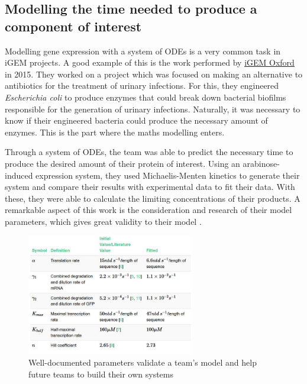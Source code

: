 \documentclass[11pt, letterpaper, english]{article}
\begin{document}
\subsection{Modelling the time needed to produce a component of interest}
\par {Modelling gene expression with a system of ODEs is a very common task in iGEM projects. A good example of this is the work performed by \href{https://2015.igem.org/Team:Oxford/Modelling#characterising-our-cells}{iGEM Oxford} in 2015. They worked on a project which was focused on making an alternative to antibiotics for the treatment of urinary infections. For this, they engineered \textit{Escherichia coli} to produce enzymes that could break down bacterial biofilms responsible for the generation of urinary infections. Naturally, it was necessary to know if their engineered bacteria could produce the necessary amount of enzymes. This is the part where the maths modelling enters.}

\par {Through a system of ODEs, the team was able to predict the necessary time to produce the desired amount of their protein of interest. Using an arabinose-induced expression system, they used Michaelis-Menten kinetics to generate their system and compare their results with experimental data to fit their data. With these, they were able to calculate the limiting concentrations of their products. A remarkable aspect of this work is the consideration and research of their model parameters, which gives great validity to their model \cite{iGEMOxford_2015}.}

\begin{figure}
	    \centering
		\caption{Well-documented parameters validate a team's model and help future teams to build their own systems \cite{iGEMOxford_2015}}
		\includegraphics[width=0.65\textwidth]{Tabla parametros.JPG}
	\end{figure}
	\vspace{0.3 cm}
\end{document}
